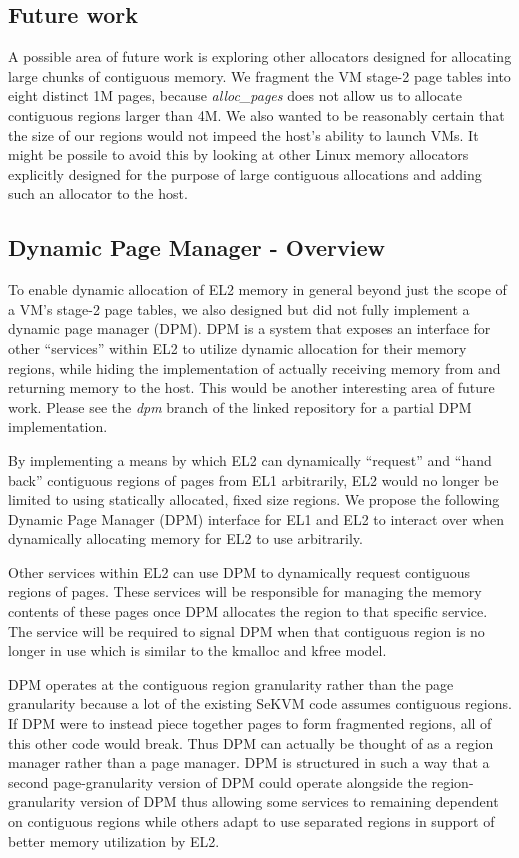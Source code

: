 \subsection{Future work}

A possible area of future work is exploring other allocators designed for
allocating large chunks of contiguous memory. We fragment the VM stage-2 page tables
into eight distinct 1M pages, because \textit{alloc\_pages} does not allow us
to allocate contiguous regions larger than 4M. We also wanted to be reasonably certain
that the size of our regions would not impeed the host's ability to launch VMs. It might be possile to avoid this
by looking at other Linux memory allocators explicitly designed for the purpose
of large contiguous allocations and adding such an allocator to the host.

\subsection{Dynamic Page Manager - Overview}
To enable dynamic allocation of EL2 memory in general beyond just the scope of
a VM's stage-2 page tables, we also designed but did not fully implement
a dynamic page manager (DPM). DPM is a system that exposes an interface for other ``services'' within EL2 to
utilize dynamic allocation for their memory regions, while hiding the implementation of actually receiving memory from
and returning memory to the host. This would be another interesting area of future work. Please
see the \textit{dpm} branch of the linked repository for a partial DPM implementation.

By implementing a means by which EL2 can dynamically “request” and “hand back” contiguous
regions of pages from EL1 arbitrarily, EL2 would no longer be limited to using statically allocated, fixed size regions.
We propose the following Dynamic Page Manager (DPM) interface for EL1 and EL2 to interact over
when dynamically allocating memory for EL2 to use arbitrarily.

Other services within EL2 can use DPM to dynamically request contiguous regions of pages.
These services will be responsible for managing the memory contents of these pages once DPM
allocates the region to that specific service. The service will be required to signal DPM
when that contiguous region is no longer in use which is similar to the kmalloc and kfree model.

DPM operates at the contiguous region granularity rather than the page granularity because
a lot of the existing SeKVM code assumes contiguous regions. If DPM were to instead piece
together pages to form fragmented regions, all of this other code would break. Thus DPM
can actually be thought of as a region manager rather than a page manager. DPM is structured
in such a way that a second page-granularity version of DPM could operate alongside the
region-granularity version of DPM thus allowing some services to remaining dependent on
contiguous regions while others adapt to use separated regions in support of better memory
utilization by EL2.

